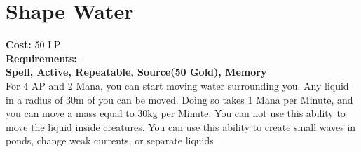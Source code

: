 \section{Shape Water}\label{spell:shapeWater}
\textbf{Cost:} 50 LP\\
\textbf{Requirements:} -\\
\textbf{Spell, Active, Repeatable, Source(50 Gold), Memory}\\
For 4 AP and 2 Mana, you can start moving water surrounding you.
Any liquid in a radius of 30m of you can be moved.
Doing so takes 1 Mana per Minute, and you can move a mass equal to 30kg per Minute.
You can not use this ability to move the liquid inside creatures.
You can use this ability to create small waves in ponds, change weak currents, or separate liquids
